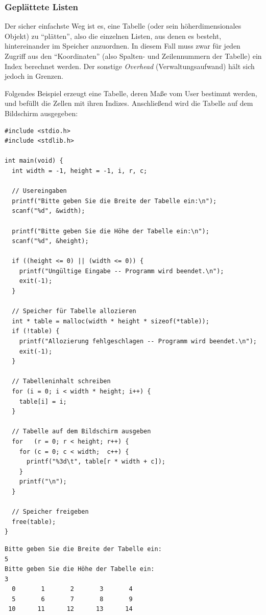 \subsubsection{Geplättete Listen}
Der sicher einfachste Weg ist es, eine Tabelle (oder sein höherdimensionales Objekt) zu \enquote{plätten}, also die einzelnen Listen, aus denen es besteht, hintereinander im Speicher anzuordnen. In diesem Fall muss zwar für jeden Zugriff aus den \enquote{Koordinaten} (also \eg Spalten- und Zeilennummern der Tabelle) ein Index berechnet werden. Der sonstige \emph{Overhead} (Verwaltungsaufwand) hält sich jedoch in Grenzen.

Folgendes Beispiel erzeugt eine Tabelle, deren Maße vom User bestimmt werden, und befüllt die Zellen mit ihren Indizes. Anschließend wird die Tabelle auf dem Bildschirm ausgegeben:

\begin{codebox}
\begin{verbatim}
#include <stdio.h>
#include <stdlib.h>

int main(void) {
  int width = -1, height = -1, i, r, c;

  // Usereingaben
  printf("Bitte geben Sie die Breite der Tabelle ein:\n");
  scanf("%d", &width);

  printf("Bitte geben Sie die Höhe der Tabelle ein:\n");
  scanf("%d", &height);

  if ((height <= 0) || (width <= 0)) {
    printf("Ungültige Eingabe -- Programm wird beendet.\n");
    exit(-1);
  }

  // Speicher für Tabelle allozieren
  int * table = malloc(width * height * sizeof(*table));
  if (!table) {
    printf("Allozierung fehlgeschlagen -- Programm wird beendet.\n");
    exit(-1);
  }

  // Tabelleninhalt schreiben
  for (i = 0; i < width * height; i++) {
    table[i] = i;
  }

  // Tabelle auf dem Bildschirm ausgeben
  for   (r = 0; r < height; r++) {
    for (c = 0; c < width;  c++) {
      printf("%3d\t", table[r * width + c]);
    }
    printf("\n");
  }

  // Speicher freigeben
  free(table);
}
\end{verbatim}
\end{codebox}

\begin{cmdbox}
\begin{verbatim}
Bitte geben Sie die Breite der Tabelle ein:
5
Bitte geben Sie die Höhe der Tabelle ein:
3
  0       1       2       3       4
  5       6       7       8       9
 10      11      12      13      14
\end{verbatim}
\end{cmdbox}


